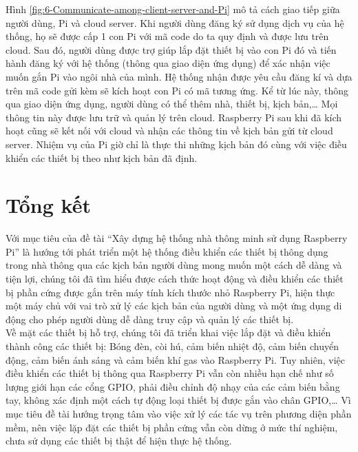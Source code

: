 \documentclass[12pt,a4paper,oneside]{extbook}
\begin{document}
\noindent
Hình \ref{fig:6-Communicate-among-client-server-and-Pi} mô tả cách giao tiếp giữa người dùng, Pi và cloud server. Khi người dùng đăng ký sử dụng dịch vụ của hệ thống, họ sẽ được cấp 1 con Pi với mã code do ta quy định và được lưu trên cloud. Sau đó, người dùng được trợ giúp lắp đặt thiết bị vào con Pi đó và tiến hành đăng ký với hệ thống (thông qua giao diện ứng dụng) để xác nhận việc muốn gắn Pi vào ngôi nhà của mình. Hệ thống nhận được yêu cầu đăng kí và dựa trên mã code gửi kèm sẽ kích hoạt con Pi có mã tương ứng. Kể từ lúc này, thông qua giao diện ứng dụng, người dùng có thể thêm nhà, thiết bị, kịch bản,\dots\hspace{0mm} Mọi thông tin này được lưu trữ và quản lý trên cloud. Raspberry Pi sau khi đã kích hoạt cũng sẽ kết nối với cloud và nhận các thông tin về kịch bản gửi từ cloud server. Nhiệm vụ của Pi giờ chỉ là thực thi những kịch bản đó cùng với việc điều khiển các thiết bị theo như kịch bản đã định.

\chapter{Tổng kết}

Với mục tiêu của đề tài “Xây dựng hệ thống nhà thông minh sử dụng Raspberry Pi” là hướng tới phát triển một hệ thống điều khiển các thiết bị thông dụng trong nhà thông qua các kịch bản người dùng mong muốn một cách dễ dàng và tiện lợi, chúng tôi đã tìm hiểu được cách thức hoạt động và điều khiển các thiết bị phần cứng được gắn trên máy tính kích thước nhỏ Raspberry Pi, hiện thực một máy chủ với vai trò xử lý các kịch bản của người dùng và một ứng dụng di động cho phép người dùng dễ dàng truy cập và quản lý các thiết bị.\\

\noindent
Về mặt các thiết bị hỗ trợ, chúng tôi đã triển khai việc lắp đặt và điều khiển thành công các thiết bị: Bóng đèn, còi hú, cảm biến nhiệt độ, cảm biến chuyển động, cảm biến ánh sáng và cảm biến khí gas vào Raspberry Pi. Tuy nhiên, việc điều khiển các thiết bị thông qua Raspberry Pi vẫn còn nhiều hạn chế như số lượng giới hạn các cổng GPIO, phải điều chỉnh độ nhạy của các cảm biến bằng tay, không xác định một cách tự động loại thiết bị được gắn vào chân GPIO,\dots\hspace{0mm} Vì mục tiêu đề tài hướng trọng tâm vào việc xử lý các tác vụ trên phương diện phần mềm, nên việc lặp đặt các thiết bị phần cứng vẫn còn dừng ở mức thí nghiệm, chưa sử dụng các thiết bị thật để hiện thực hệ thống.\\
\end{document}
